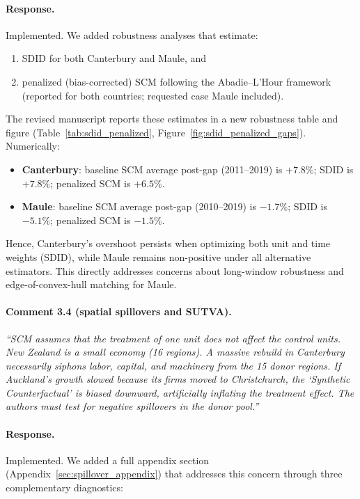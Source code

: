 \paragraph{Response.}
Implemented. We added robustness analyses that estimate:
\begin{enumerate}
  \item SDID for both Canterbury and Maule, and
  \item penalized (bias-corrected) SCM following the Abadie--L'Hour framework (reported for both countries; requested case Maule included).
\end{enumerate}

The revised manuscript reports these estimates in a new robustness table and figure (Table~\ref{tab:sdid_penalized}, Figure~\ref{fig:sdid_penalized_gaps}). Numerically:
\begin{itemize}
  \item \textbf{Canterbury}: baseline SCM average post-gap (2011--2019) is \(+7.8\%\); SDID is \(+7.8\%\); penalized SCM is \(+6.5\%\).
  \item \textbf{Maule}: baseline SCM average post-gap (2010--2019) is \(-1.7\%\); SDID is \(-5.1\%\); penalized SCM is \(-1.5\%\).
\end{itemize}

Hence, Canterbury's overshoot persists when optimizing both unit and time weights (SDID), while Maule remains non-positive under all alternative estimators. This directly addresses concerns about long-window robustness and edge-of-convex-hull matching for Maule.

\paragraph{Comment 3.4 (spatial spillovers and SUTVA).}
\textit{``SCM assumes that the treatment of one unit does not affect the control units. New Zealand is a small economy (16 regions). A massive rebuild in Canterbury necessarily siphons labor, capital, and machinery from the 15 donor regions. If Auckland's growth slowed because its firms moved to Christchurch, the `Synthetic Counterfactual' is biased downward, artificially inflating the treatment effect. The authors must test for negative spillovers in the donor pool.''}

\paragraph{Response.}
Implemented. We added a full appendix section (Appendix~\ref{sec:spillover_appendix}) that addresses this concern through three complementary diagnostics:

